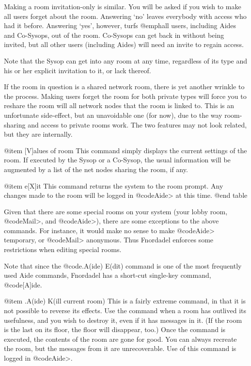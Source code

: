 Making a room invitation-only is similar.
You will be asked if you wish to make all users forget
about the room.  Answering `no' leaves everybody with
access who had it before.  Answering `yes', however,
turfs @emph{all} users, including Aides and Co-Sysops, out of the room.
Co-Sysops can get back in without being invited, but all other users
(including Aides) will need an invite to regain access.

Note that the Sysop can get into any room at any time, regardless
of its type and his or her explicit invitation to it, or lack thereof.

If the room in question is a shared network
room, there is yet another wrinkle to the process.
Making users forget the room for both private types
will force you to reshare the room will all network
nodes that the room is linked to.  This is an
unfortunate side-effect, but an unavoidable one (for
now), due to the way room-sharing and access to
private rooms work.  The two features may not look
related, but they are internally.

@item [V]alues of room
This command simply displays the current
settings of the room.  If executed by the Sysop or a Co-Sysop, the
usual information will be augmented by a list of the
net nodes sharing the room, if any.

@item e[X]it
This command returns the system to the room
prompt.  Any changes made to the room will be logged
in @code{Aide>} at this time.
@end table

Given that there are some special rooms on your system (your
lobby room, @code{Mail>}, and @code{Aide>}), there are some exceptions to
the above commands.  For instance, it would make no sense to
make @code{Aide>} temporary, or @code{Mail>} anonymous.  Thus Fnordadel
enforces some restrictions when editing special rooms.

Note that since the @code{.A(ide) E(dit)} command is one of
the most frequently used Aide commands, Fnordadel has a
short-cut single-key command, @code{[A]ide}.

@item .A(ide) K(ill current room)
This is a fairly extreme command, in that it is not
possible to reverse its effects.  Use the command when a room
has outlived its usefulness, and you wish to destroy it, even
if it has messages in it.  (If the room is the last on its
floor, the floor will disappear, too.)  Once the command is
executed, the
contents of the room are gone for good.  You can always
recreate the room, but the messages from it are
unrecoverable.  Use of this command is logged in @code{Aide>}.

